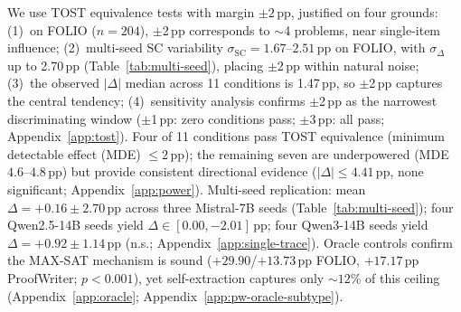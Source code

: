  We use TOST equivalence tests \citep{lakens2017equivalence} with margin $\pm 2$\,pp, justified on four grounds: (1)~on FOLIO ($n{=}204$), $\pm$2\,pp corresponds to ${\sim}$4 problems, near single-item influence; (2)~multi-seed SC variability $\sigma_{\text{SC}} = 1.67$--$2.51$\,pp on FOLIO, with $\sigma_\Delta$ up to 2.70\,pp (Table~\ref{tab:multi-seed}), placing $\pm$2\,pp within natural noise; (3)~the observed $|\Delta|$ median across 11 conditions is 1.47\,pp, so $\pm$2\,pp captures the central tendency; (4)~sensitivity analysis confirms $\pm$2\,pp as the narrowest discriminating window ($\pm$1\,pp: zero conditions pass; $\pm$3\,pp: all pass; Appendix~\ref{app:tost}). Four of 11 conditions pass TOST equivalence (minimum detectable effect (MDE) $\leq 2$\,pp); the remaining seven are underpowered (MDE $4.6$--$4.8$\,pp) but provide consistent directional evidence ($|\Delta| \leq 4.41$\,pp, none significant; Appendix~\ref{app:power}). Multi-seed replication: mean $\Delta = +0.16 \pm 2.70$\,pp across three Mistral-7B seeds (Table~\ref{tab:multi-seed}); four Qwen2.5-14B seeds yield $\Delta \in [0.00, -2.01]$\,pp; four Qwen3-14B seeds yield $\Delta = +0.92 \pm 1.14$\,pp (n.s.; Appendix~\ref{app:single-trace}). Oracle controls confirm the MAX-SAT mechanism is sound ($+29.90$/$+13.73$\,pp FOLIO, $+17.17$\,pp ProofWriter; $p < 0.001$), yet self-extraction captures only ${\sim}12\%$ of this ceiling (Appendix~\ref{app:oracle}; Appendix~\ref{app:pw-oracle-subtype}).

